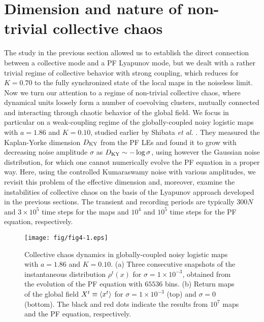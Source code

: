 \documentclass[12pt]{iopart}
\begin{document}
\section{Dimension and nature of non-trivial collective chaos}  \label{sec:ColChaos}

The study in the previous section
 allowed us to establish the direct connection between
 a collective mode and a PF Lyapunov mode,
 but we dealt with a rather trivial regime of collective behavior
 with strong coupling, which reduces for $K=0.70$
 to the fully synchronized state of the local maps in the noiseless limit.
Now we turn our attention to a regime of non-trivial collective chaos,
 where dynamical units loosely form a number of coevolving clusters,
 mutually connected and interacting
 through chaotic behavior of the global field.
We focus in particular on a weak-coupling regime
 of the globally-coupled noisy logistic maps 
 with $a=1.86$ and $K=0.10$,
 studied earlier by Shibata \textit{et al.} \cite{Shibata.etal-PRL1999}.
They measured the Kaplan-Yorke dimension $D_{\rm KY}$ from the PF LEs
 and found it to grow with decreasing noise amplitude $\sigma$ as
 $D_{\rm KY} \sim -\log\sigma$, using however the Gaussian noise distribution,
 for which one cannot numerically evolve the PF equation 
 in a proper way.
Here, using the controlled Kumaraswamy noise with various amplitudes,
 we revisit this problem of the effective dimension and, moreover,
 examine the instabilities of collective chaos
 on the basis of the Lyapunov approach developed in the previous sections.
The transient and recording periods are typically
 $300N$ and $3 \times 10^5$ time steps for the maps
 and $10^4$ and $10^5$ time steps for the PF equation,
 respectively.

\begin{figure}[t]
 \begin{center}
  \texttt{[image: fig/fig4-1.eps]}
  \caption{Collective chaos dynamics in globally-coupled noisy logistic maps  with $a=1.86$ and $K=0.10$. (a) Three consecutive snapshots of the instantaneous distribution $\rho^t(x)$ for $\sigma = 1 \times 10^{-3}$, obtained from the evolution of the PF equation  with $65536$ bins. (b) Return maps of the global field $X^t \equiv \langle x^t \rangle$ for $\sigma = 1 \times 10^{-3}$ (top) and $\sigma = 0$ (bottom). The black and red dots indicate the results from $10^7$ maps and the PF equation, respectively.}
  \label{fig:4-1}
 \end{center}
\end{figure}%
\end{document}
